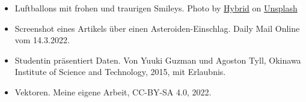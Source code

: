 \documentclass{beamer}
\begin{document}
\begin{frame}
\begin{tiny}
\begin{itemize}
\item
Luftballons mit frohen und traurigen Smileys. Photo by \href{https://unsplash.com/@artbyhybrid?utm_source=unsplash&utm_medium=referral&utm_content=creditCopyText}{Hybrid} on \href{https://unsplash.com/s/photos/feedback?utm_source=unsplash&utm_medium=referral&utm_content=creditCopyText}{Unsplash}


\item
Screenshot eines Artikels über einen Asteroiden-Einschlag. Daily Mail Online vom 14.3.2022.
\item
Studentin präsentiert Daten. Von Yuuki Guzman und Agoston Tyll, Okinawa Institute of Science and Technology, 2015, mit Erlaubnis. 
\item
Vektoren. Meine eigene Arbeit, CC-BY-SA 4.0, 2022.
\end{itemize}

\end{tiny}
\end{frame}
\end{document}
